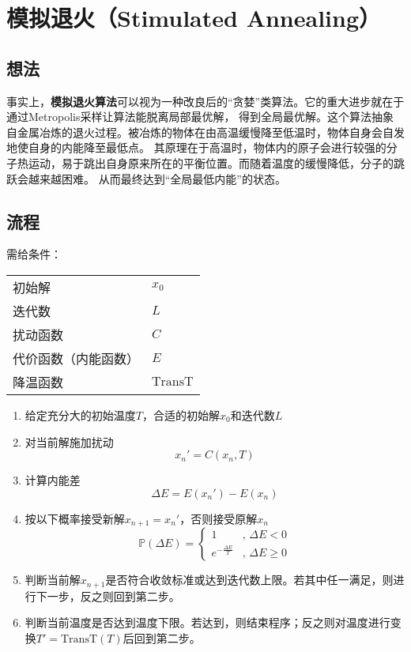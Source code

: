 \documentclass{ctexart}
\begin{document}
\section{模拟退火（Stimulated Annealing）}

\subsection{想法}

事实上，\textbf{模拟退火算法}可以视为一种改良后的``贪婪''类算法。它的重大进步就在于通过Metropolis采样让算法能脱离局部最优解，
得到全局最优解。这个算法抽象自金属冶炼的退火过程。被冶炼的物体在由高温缓慢降至低温时，物体自身会自发地使自身的内能降至最低点。
其原理在于高温时，物体内的原子会进行较强的分子热运动，易于跳出自身原来所在的平衡位置。而随着温度的缓慢降低，分子的跳跃会越来越困难。
从而最终达到``全局最低内能''的状态。

\subsection{流程}

\noindent 需给条件：\\
\begin{tabular}[t]{l|l}
    \hline
    初始解 &  $x_0$\\
    迭代数 & $L$ \\
    扰动函数 & $C$\\
    代价函数（内能函数） & $E$\\
    降温函数 & $\text{TransT}$\\
    \hline
\end{tabular}


\begin{enumerate}
    \item 给定充分大的初始温度$T$，合适的初始解$x_0$和迭代数$L$
    \item 对当前解施加扰动\[x_n' = C(x_n, T)\]
    \item 计算内能差\[\varDelta E = E(x_n') - E(x_n)\]
    \item 按以下概率接受新解$x_{n+1}=x_n'$，否则接受原解$x_n$ \[\mathbb{P} (\varDelta E )=\left\{ 
        \begin{array}{ll}
            1 & \text{, }\varDelta E < 0\\
            e^{-\frac{\varDelta E }{T}} & \text{, }\varDelta E \geq 0
        \end{array} \right.\]
    \item 判断当前解$x_{n+1}$是否符合收敛标准或达到迭代数上限。若其中任一满足，则进行下一步，反之则回到第二步。
    \item 判断当前温度是否达到温度下限。若达到，则结束程序；反之则对温度进行变换$T' = \text{TransT}(T)$后回到第二步。
\end{enumerate}
\end{document}
